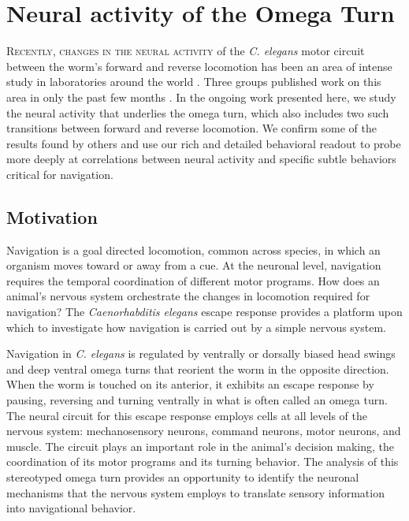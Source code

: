 

\chapter{Neural activity of the Omega Turn}\label{chapter:omegaTurn}



\lettrine{R}{ecently, changes in the neural activity} of the  \textit{C. elegans}  motor circuit between  the worm's forward and reverse locomotion has been an area of intense study in laboratories around the world \citep{piggott_neural_2011, faumont_image-free_2011, kawano_imbalancing_2011, ben_arous_automated_2010}.
Three groups published work on this area in only the past few months \citep{piggott_neural_2011, faumont_image-free_2011, kawano_imbalancing_2011}. In the ongoing work presented here, we study the neural activity that underlies the omega turn, which also includes two such transitions between  forward and reverse locomotion. We confirm some of the results found by others and use our rich and detailed behavioral readout to probe more deeply at correlations between  neural activity and specific subtle behaviors critical for navigation. 

\section{Motivation}

Navigation is a goal directed locomotion, common across species, in which an organism moves toward or away from a cue.  At the neuronal level, navigation requires the temporal coordination of different motor programs.  How does an animal's nervous system orchestrate the changes in locomotion required for navigation? The \textit{Caenorhabditis elegans} escape response provides a platform upon which to investigate how navigation is carried out by a simple nervous system.  

Navigation in  \textit{C. elegans} is regulated by ventrally or dorsally biased head swings \citep{iino_parallel_2009} and deep ventral omega turns that reorient the worm in the opposite direction.  When the worm is touched on its anterior, it exhibits an escape response by pausing, reversing and turning ventrally in what is often called an omega turn.  The neural circuit for this escape response employs cells at all levels of the nervous system: mechanosensory neurons, command neurons, motor neurons, and muscle. The circuit plays an important role in the animal's decision making, the coordination of its motor programs and its turning behavior. 
The analysis of this stereotyped omega turn provides an opportunity to identify the  neuronal mechanisms that the nervous system employs to translate sensory information into navigational behavior.  


